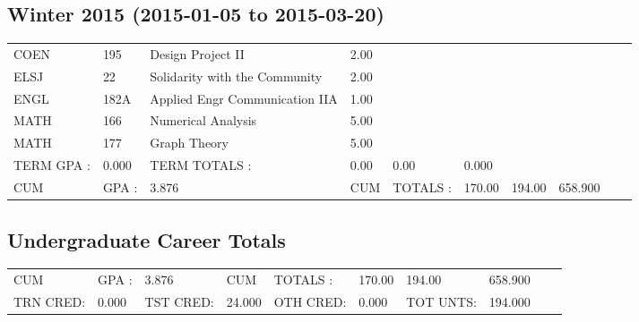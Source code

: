 \documentclass{scrartcl}\usepackage[T1]{fontenc}
\begin{document}
\subsection{Winter 2015	(2015-01-05 to 2015-03-20)}
\begin{tabular}{ l  l  l  l  l  l  l  l  l  l }
COEN&195&Design Project II&2.00& & & & & & \\
ELSJ&22&Solidarity with the Community&2.00& & & & & & \\
ENGL&182A&Applied Engr Communication IIA&1.00& & & & & & \\
MATH&166&Numerical Analysis&5.00& & & & & & \\
MATH&177&Graph Theory&5.00& & & & & & \\
\hline
TERM GPA :&0.000&TERM TOTALS :&0.00&0.00&0.000& & & & \\
CUM&GPA :&3.876&CUM&TOTALS :&170.00&194.00&658.900& & \\\end{tabular}
\subsection{Undergraduate Career Totals}
\begin{tabular}{ l  l  l  l  l  l  l  l  l  l }
CUM&GPA :&3.876&CUM&TOTALS :&170.00&194.00&658.900& & \\
TRN CRED:&0.000&TST CRED:&24.000&OTH CRED:&0.000&TOT UNTS:&194.000& & \\\end{tabular}
\end{document}
